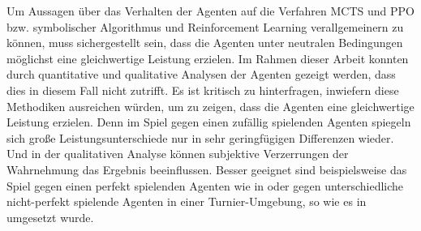 Um Aussagen über das Verhalten der Agenten auf die Verfahren MCTS und PPO bzw. symbolischer Algorithmus und Reinforcement Learning verallgemeinern zu können, muss sichergestellt sein, dass die Agenten unter neutralen Bedingungen möglichst eine gleichwertige Leistung erzielen. Im Rahmen dieser Arbeit konnten durch quantitative und qualitative Analysen der Agenten gezeigt werden, dass dies in diesem Fall nicht zutrifft. Es ist kritisch zu hinterfragen, inwiefern diese Methodiken ausreichen würden, um zu zeigen, dass die Agenten eine gleichwertige Leistung erzielen. Denn im Spiel gegen einen zufällig spielenden Agenten spiegeln sich große Leistungsunterschiede nur in sehr geringfügigen Differenzen wieder. Und in der qualitativen Analyse können subjektive Verzerrungen der Wahrnehmung das Ergebnis beeinflussen. Besser geeignet sind beispielsweise das Spiel gegen einen perfekt spielenden Agenten wie in \cite{Thill.2012} oder gegen unterschiedliche nicht-perfekt spielende Agenten in einer Turnier-Umgebung, so wie es in \cite{Zhong.2020} umgesetzt wurde.
